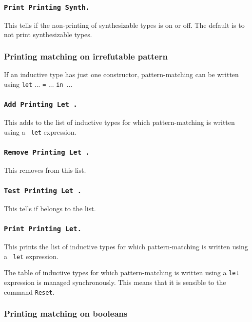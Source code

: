\subsubsection{\tt Print Printing Synth.}
This tells if the non-printing
of synthesizable types is on or off. The default is to not print 
synthesizable types.

\subsubsection{Printing matching on irrefutable pattern}

If an inductive type has just one constructor,
pattern-matching can be written using {\tt let} ... {\tt =}
... {\tt in}~...

\subsubsection{\tt Add Printing Let {\ident}.}
This adds {\ident} to the list
of inductive types for which pattern-matching is written using a {\tt
let} expression.

\subsubsection{\tt Remove Printing Let {\ident}.}
This removes {\ident} from this list.

\subsubsection{\tt Test Printing Let {\ident}.}
This tells if {\ident} belongs
to the list.

\subsubsection{\tt Print Printing Let.}
This prints the list of inductive types
for which pattern-matching is written using a {\tt
let} expression.

The table of inductive types for which pattern-matching is written
using a {\tt let} expression is managed synchronously. This means that
it is sensible to the command {\tt Reset}.


\subsubsection{Printing matching on booleans}

